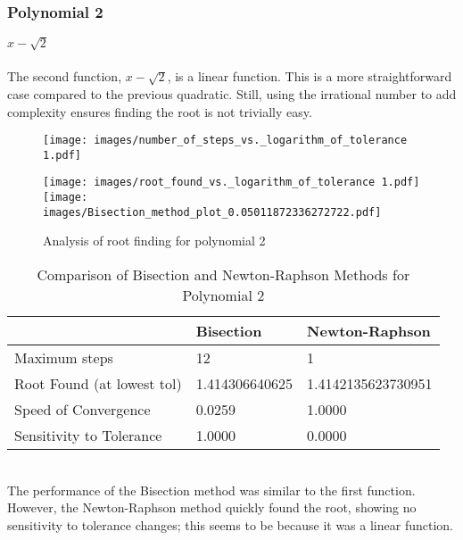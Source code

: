 \documentclass{llncs}
\numberwithin{figure}{section}
\begin{document}
\subsubsection{Polynomial 2} \(x - \sqrt{2}\)
\\\\The second function, $x - \sqrt2$, is a linear function. This is a more straightforward case compared to the previous quadratic. Still, using the irrational number to add complexity ensures finding the root is not trivially easy.
\begin{figure}[h!]
    \centering
    \begin{minipage}[c]{0.65\textwidth}
        \centering
        \texttt{[image: images/number\_of\_steps\_vs.\_logarithm\_of\_tolerance 1.pdf]}
    \end{minipage}%
    \begin{minipage}[c]{0.35\textwidth}
        \centering
        \texttt{[image: images/root\_found\_vs.\_logarithm\_of\_tolerance 1.pdf]}
        \hspace{6em} %
        \texttt{[image: images/Bisection\_method\_plot\_0.05011872336272722.pdf]}
    \end{minipage}
    \caption{Analysis of root finding for polynomial 2}
    \label{fig:composite}
\end{figure}
\vspace{-2em}
\begin{table}[h!]
\centering
\caption{Comparison of Bisection and Newton-Raphson Methods for Polynomial 2}
\begin{tabularx}{\textwidth}{|X|X|X|}
\hline
 & Bisection & Newton-Raphson \\
\hline
Maximum steps & 12 & 1 \\
\hline
Root Found (at lowest tol) & 1.414306640625 & 1.4142135623730951 \\
\hline
Speed of Convergence & 0.0259 & 1.0000 \\
\hline
Sensitivity to Tolerance & 1.0000 & 0.0000 \\
\hline
\end{tabularx}
\end{table}
\\The performance of the Bisection method was similar to the first function. However, the Newton-Raphson method quickly found the root, showing no sensitivity to tolerance changes; this seems to be because it was a linear function.
\newpage
\end{document}
